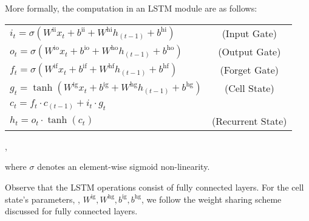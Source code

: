 \documentclass{article}
\begin{document}
More formally, the computation in an LSTM module are as follows:
\begin{center}
\begin{tabular}{lc}
 $i_t = \sigma(W^\text{ii} x_t + b^\text{ii} + W^\text{hi} h_{(t-1)} + b^\text{hi})$ & (Input Gate)\\
 $o_t = \sigma(W^\text{io} x_t + b^\text{io} + W^\text{ho} h_{(t-1)} + b^\text{ho})$ & (Output  Gate)\\
 $f_t = \sigma(W^\text{if} x_t + b^\text{if} + W^\text{hf} h_{(t-1)} + b^\text{hf})$ & (Forget Gate) \\
 $g_t = \tanh(W^\text{ig} x_t + b^\text{ig} + W^\text{hg} h_{(t-1)} + b^\text{hg})$ &  (Cell State) \\
 $ c_t = f_t \cdot c_{(t-1)} + i_t \cdot g_t$ & \\
 $h_t = o_t \cdot \tanh(c_t)$ & (Recurrent State)\\
\end{tabular},
\end{center}
where $\sigma$ denotes an element-wise sigmoid non-linearity.

Observe that the LSTM operations consist of fully connected layers. For the cell state's parameters, \eg, $W^\text{ig}, W^\text{hg}, b^\text{ig}, b^\text{hg}$, we  follow the weight sharing scheme discussed for fully connected layers. 
\end{document}

